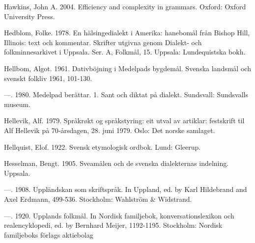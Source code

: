 Hawkins, John A. 2004. Efficiency and complexity in grammars. Oxford: Oxford University Press.


Hedblom, Folke. 1978. En hälsingedialekt i Amerika: hanebomål från Bishop Hill, Illinois: text och kommentar. Skrifter utgivna genom Dialekt- och folkminnesarkivet i Uppsala. Ser. A, Folkmål, 15. Uppsala: Lundequistska bokh.


Hellbom, Algot. 1961. Dativböjning i Medelpads bygdemål. Svenska landsmål och svenskt folkliv 1961, 101-130.


—. 1980. Medelpad berättar. 1. Sant och diktat på dialekt. Sundsvall: Sundsvalls museum.


Hellevik, Alf. 1979. Språkrøkt og språkstyring: eit utval av artiklar: festskrift til Alf Hellevik på 70-årsdagen, 28. juni 1979. Oslo: Det norske samlaget.


Hellquist, Elof. 1922. Svensk etymologisk ordbok. Lund: Gleerup.


Hesselman, Bengt. 1905. Sveamålen och de svenska dialekternas indelning. Uppsala.


—. 1908. Uppländskan som skriftspråk. In Uppland, ed. by Karl Hildebrand and Axel Erdmann, 499-536. Stockholm: Wahlström \& Widstrand.


—. 1920. Upplands folkmål. In Nordisk familjebok, konversationslexikon och realencyklopedi, ed. by Bernhard Meijer, 1192-1195. Stockholm: Nordisk familjeboks förlags aktiebolag 


